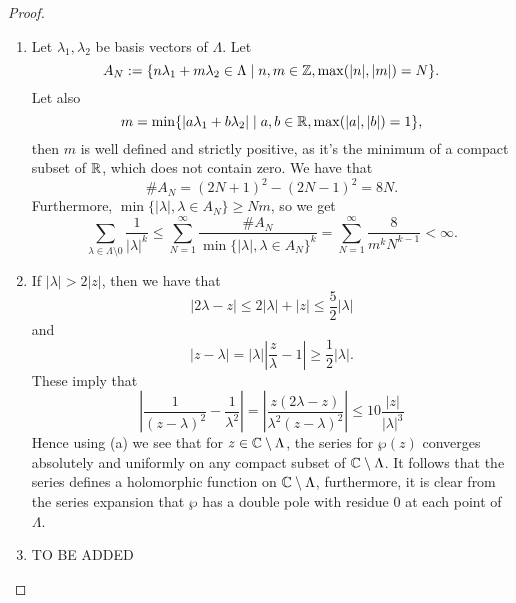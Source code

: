\begin{proof}
	\begin{enumerate}[label=(\alph*)]
	\item	Let $\lambda_1, \lambda_2$ be basis vectors of $\Lambda$.
		Let 
		\begin{equation*}
			A_N := \{n\lambda_1 + m\lambda_2 \in \Lambda \mid
			n, m \in \mathbb{Z}, \max(|n|, |m|) = N\}.
		\end{equation*}
		Let also 
		\begin{equation*}
			m = \min\{|a\lambda_1 + b\lambda_2| \mid 
			a, b \in \mathbb{R}, \max(|a|,|b|) = 1\},
		\end{equation*}
		then $m$ is well defined and strictly positive,
		as it's the minimum of a compact subset of $\mathbb{R}$, which does
		not contain zero. We have that
		\begin{equation*}
			\#A_N = (2N + 1)^2 - (2N - 1)^2 = 8N.
		\end{equation*}
		Furthermore, $\min\{|\lambda|, \lambda \in A_N\} \geq Nm$, so we
		get
		\begin{equation*}
			\sum_{\lambda \in \Lambda\setminus 0}\frac{1}{|\lambda|^k}
			\leq \sum_{N=1}^\infty \frac{\#A_N}{\min\{|\lambda|, \lambda \in
			A_N\}^k}
			= \sum_{N=1}^{\infty} \frac{8}{m^kN^{k-1}} < \infty.
		\end{equation*}
	\item
		If $|\lambda| > 2|z|$, then we have that
		\begin{equation*}
			|2\lambda - z| \leq 2|\lambda| + |z| \leq \frac{5}{2}|\lambda|
		\end{equation*}
		and
		\begin{equation*}
			|z - \lambda| = |\lambda|\left|\frac{z}{\lambda} - 1\right| \geq
			\frac{1}{2}|\lambda|.
		\end{equation*}
		These imply that
		\begin{equation*}
			\left| \frac{1}{(z - \lambda)^2} - \frac{1}{\lambda^2}\right|
			= \left| \frac{z(2\lambda - z)}{\lambda^2(z - \lambda)^2}\right|
			\leq 10\frac{|z|}{|\lambda|^3}
		\end{equation*}
		Hence using (a) we see that for $z \in \mathbb{C} \setminus \Lambda$,
		the series for $\wp(z)$ converges absolutely and uniformly on any 
		compact subset of $\mathbb{C} \setminus \Lambda$. It follows that
		the series defines a holomorphic function on $\mathbb{C} \setminus \Lambda$,
		furthermore, it is clear from the series expansion that $\wp$ has
		a double pole with residue $0$ at each point of $\Lambda$.
	\item TO BE ADDED
	\end{enumerate}
\end{proof}

